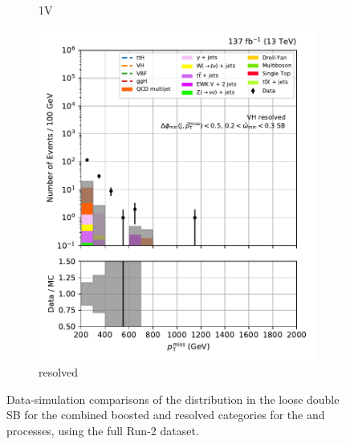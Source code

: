 \begin{figure}[htbp]
\begin{subfigure}[b]{0.24\textwidth}
        \caption{\VH 1V}
    \end{subfigure}
    \hfill
    \begin{subfigure}[b]{0.24\textwidth}
        \includegraphics[width=\textwidth]{figures/region_plots/full_Run2/sideband_1/VH_resolved.pdf}
        \caption{\VH resolved}
    \end{subfigure}
    \caption[Data-simulation comparisons of the \ptmiss distribution in the loose double sideband for the combined boosted and resolved categories for the \ttH and \VH processes, using the full Run-2 dataset]{Data-simulation comparisons of the \ptmiss distribution in the loose double \gls{SB} for the combined boosted and resolved categories for the \ttH and \VH processes, using the full Run-2 dataset.}
    \label{fig:htoinv_sb_yields_comb2016to18_loose_double}
\end{figure}

